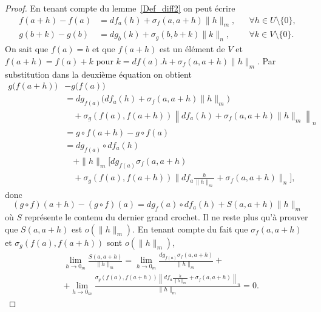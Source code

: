 \begin{proof}
	En tenant compte du lemme~\ref{Def_diff2} on peut écrire
	\begin{subequations}
		\begin{align}
			f(a+h)-f(a) & =df_a(h)+\sigma_f(a,a+h)\|h\|_m, &  & \forall h\in U\setminus \{0\}, \\
			g(b+k)-g(b) & =dg_b(k)+\sigma_g(b,b+k)\|k\|_n, &  & \forall k\in V\setminus \{0\}.
		\end{align}
	\end{subequations}
	On sait que \( f(a)=b\) et que \( f(a+h)\) est  un élément de \( V\) et \( f(a+h)=f(a)+k\) pour \( k=df(a).h+\sigma_f(a,a+h)\|h\|_m\).  Par substitution dans la deuxième équation on obtient
	\begin{equation}
		\begin{aligned}
			g\big(f(a+h)\big) & - g\big(f(a)\big)                                                                                  \\
			                  & =dg_{f(a)}\Big(df_a(h)+\sigma_f(a,a+h)\|h\|_m\Big)                                                 \\
			                  & \quad+\sigma_g\left(f(a), f(a+h)\right)\left\| df_a(h)+\sigma_f(a,a+h)\|h\|_m\right \|_n           \\
			                  & =g\circ f (a+h) - g\circ f (a)                                                                     \\
			                  & = dg_{f(a)}\circ df_a(h)                                                                           \\
			                  & \quad +\|h\|_m\Big[ dg_{f(a)}\sigma_f(a,a+h)                                                       \\
			                  & \quad+\sigma_g\left(f(a), f(a+h)\right)\big\| df_a\frac{h}{\|h\|_m}+\sigma_f(a,a+h)\big \|_n\Big],
		\end{aligned}
	\end{equation}
	donc
	\begin{equation}
		(g\circ f) (a+h) - (g\circ f) (a) = dg_f(a)\circ df_a(h) + S(a,a+h) \|h\|_m
	\end{equation}
	où \( S\) représente le contenu du dernier grand crochet. Il ne reste plus qu'à prouver que \( S(a,a+h)\) est \( o(\|h\|_m)\). En tenant compte du fait que \( \sigma_f(a,a+h)\) et \( \sigma_g\left(f(a), f(a+h)\right)\) sont \( o (\|h\|_m)\),
	\begin{equation}
		\begin{aligned}
			 & \lim_{h\to 0_m} \frac{S(a,a+h)}{\|h\|_m}= \lim_{h\to 0_m}\frac{dg_{f(a)}\sigma_f(a,a+h)}{\|h\|_m}+                              \\
			 & + \lim_{h\to 0_m}\frac{\sigma_g\left(f(a), f(a+h)\right)\left\| df_a\frac{h}{\|h\|_m}+\sigma_f(a,a+h)\right \|_n}{\|h\|_m} = 0.
		\end{aligned}
	\end{equation}
\end{proof}

